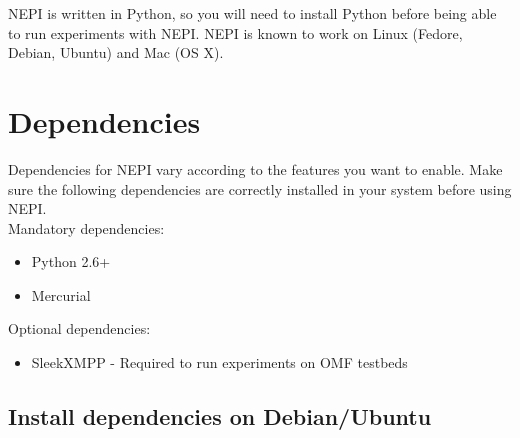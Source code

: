 %
%
%
%
%
%

NEPI is written in Python, so you will need to install Python before 
being able to run experiments with NEPI. 
NEPI is known to work on Linux (Fedore, Debian, Ubuntu) and Mac (OS X).

\section{Dependencies}

Dependencies for NEPI vary according to the features you want to enable.
Make sure the following dependencies are correctly installed in your system
before using NEPI. \\

Mandatory dependencies:
\begin{itemize}
    \item Python 2.6+
    \item Mercurial 
\end{itemize}

Optional dependencies:
\begin{itemize}
    \item SleekXMPP - Required to run experiments on OMF testbeds
\end{itemize}

\subsection{Install dependencies on Debian/Ubuntu}

\begingroup
    \fontsize{10pt}{12pt}\selectfont

